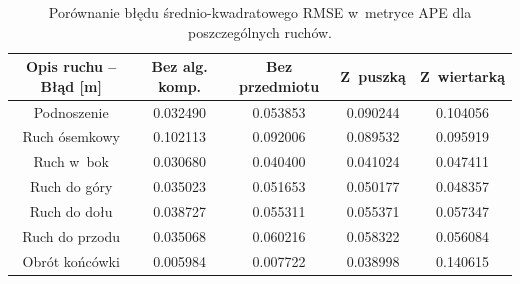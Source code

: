 {\small
\begin{table}[H]

	\begin{tabular}{||c | c c c c ||}

		\hline

		Opis ruchu --  Błąd [m]  &  Bez alg. komp. & Bez przedmiotu & Z~puszką  & Z~wiertarką  \\ [0.5ex]

		\hline\hline

		Podnoszenie & 0.032490 & 0.053853 & 0.090244 & 0.104056 \\
		Ruch ósemkowy &0.102113  & 0.092006 & 0.089532 & 0.095919 \\
		Ruch w~bok & 0.030680 & 0.040400 & 0.041024 &  0.047411\\
		Ruch do góry & 0.035023 & 0.051653 & 0.050177& 0.048357 \\
		Ruch do dołu & 0.038727 & 0.055311 & 0.055371 & 0.057347 \\
		Ruch do przodu & 0.035068 & 0.060216 & 0.058322 & 0.056084 \\
		Obrót końcówki & 0.005984 & 0.007722 & 0.038998 & 0.140615\\
		\hline

	\end{tabular}

	\caption{Porównanie błędu średnio-kwadratowego RMSE w~metryce APE dla poszczególnych ruchów.}

	\label{tab:}

\end{table}
}